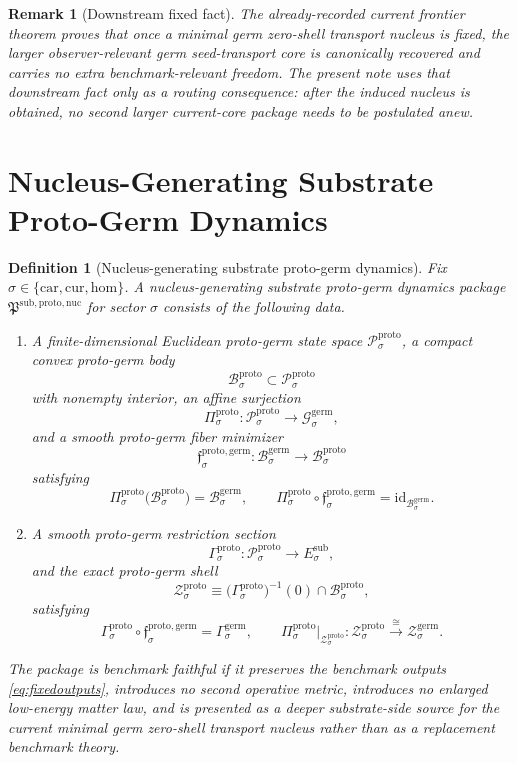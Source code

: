 \documentclass[11pt]{article}
\newcommand{\Car}{\mathrm{car}}
\newcommand{\Cur}{\mathrm{cur}}
\newcommand{\Hom}{\mathrm{hom}}
\newcommand{\SubTarget}[1]{E_{#1}^{\mathrm{sub}}}
\newcommand{\GermState}[1]{\mathcal G_{#1}^{\mathrm{germ}}}
\newcommand{\GermBody}[1]{\mathcal B_{#1}^{\mathrm{germ}}}
\newcommand{\GermSection}[1]{\Gamma_{#1}^{\mathrm{germ}}}
\newcommand{\GermShell}[1]{\mathcal Z_{#1}^{\mathrm{germ}}}
\newcommand{\ProtoPackage}{\mathfrak P^{\mathrm{sub,proto,nuc}}}
\newcommand{\ProtoState}[1]{\mathcal P_{#1}^{\mathrm{proto}}}
\newcommand{\ProtoBody}[1]{\mathcal B_{#1}^{\mathrm{proto}}}
\newcommand{\ProtoProj}[1]{\Pi_{#1}^{\mathrm{proto}}}
\newcommand{\ProtoGermMin}[1]{\mathfrak f_{#1}^{\mathrm{proto,germ}}}
\newcommand{\ProtoSection}[1]{\Gamma_{#1}^{\mathrm{proto}}}
\newcommand{\ProtoShell}[1]{\mathcal Z_{#1}^{\mathrm{proto}}}
\newtheorem{definition}{Definition}
\newtheorem{remark}{Remark}
\begin{document}
\begin{remark}[Downstream fixed fact]
\label{rem:downstream}
The already-recorded current frontier theorem proves that once a minimal germ zero-shell transport nucleus is fixed, the larger observer-relevant germ seed-transport core is canonically recovered and carries no extra benchmark-relevant freedom. The present note uses that downstream fact only as a routing consequence: after the induced nucleus is obtained, no second larger current-core package needs to be postulated anew.
\end{remark}

\section{Nucleus-Generating Substrate Proto-Germ Dynamics}

\begin{definition}[Nucleus-generating substrate proto-germ dynamics]
\label{def:proto}
Fix \(\sigma\in\{\Car,\Cur,\Hom\}\). A nucleus-generating substrate proto-germ dynamics package \(\ProtoPackage\) for sector \(\sigma\) consists of the following data.
\begin{enumerate}
    \item A finite-dimensional Euclidean proto-germ state space \(\ProtoState{\sigma}\), a compact convex proto-germ body
    \[
    \ProtoBody{\sigma}\subset\ProtoState{\sigma}
    \]
    with nonempty interior, an affine surjection
    \[
    \ProtoProj{\sigma}:\ProtoState{\sigma}\to\GermState{\sigma},
    \]
    and a smooth proto-germ fiber minimizer
    \[
    \ProtoGermMin{\sigma}:\GermBody{\sigma}\to\ProtoBody{\sigma}
    \]
    satisfying
    \[
    \ProtoProj{\sigma}\bigl(\ProtoBody{\sigma}\bigr)=\GermBody{\sigma},
    \qquad
    \ProtoProj{\sigma}\circ\ProtoGermMin{\sigma}
    =
    \mathrm{id}_{\GermBody{\sigma}}.
    \]
    \item A smooth proto-germ restriction section
    \[
    \ProtoSection{\sigma}:\ProtoState{\sigma}\to\SubTarget{\sigma},
    \]
    and the exact proto-germ shell
    \[
    \ProtoShell{\sigma}
    \equiv
    \bigl(\ProtoSection{\sigma}\bigr)^{-1}(0)\cap\ProtoBody{\sigma},
    \]
    satisfying
    \[
    \ProtoSection{\sigma}\circ\ProtoGermMin{\sigma}
    =
    \GermSection{\sigma},
    \qquad
    \ProtoProj{\sigma}\big|_{\ProtoShell{\sigma}}
    :
    \ProtoShell{\sigma}
    \xrightarrow{\cong}
    \GermShell{\sigma}.
    \]
\end{enumerate}
The package is \emph{benchmark faithful} if it preserves the benchmark outputs \eqref{eq:fixedoutputs}, introduces no second operative metric, introduces no enlarged low-energy matter law, and is presented as a deeper substrate-side source for the current minimal germ zero-shell transport nucleus rather than as a replacement benchmark theory.
\end{definition}
\end{document}
